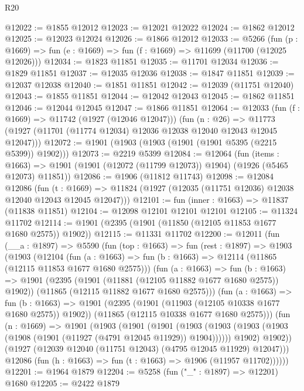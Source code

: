 \begin{lexlean}{R20}
\begin{coremodule}
@12022 := @1855 @12012
@12023 := @12021 @12022
@12024 := @1862 @12012
@12025 := @12023 @12024
@12026 := @1866 @12012
@12033 := @5266
    (fun (p : @1669) => fun (e : @1669) => fun (f : @1669) => @11699 (@11700 (@12025 @12026)))
@12034 := @1823 @11851
@12035 := @11701 @12034
@12036 := @1829 @11851
@12037 := @12035 @12036
@12038 := @1847 @11851
@12039 := @12037 @12038
@12040 := @1851 @11851
@12042 := @12039 (@11751 @12040)
@12043 := @1855 @11851
@12044 := @12042 @12043
@12045 := @1862 @11851
@12046 := @12044 @12045
@12047 := @1866 @11851
@12064 := @12033
    (fun (f : @1669) => @11742 (@1927 (@12046 @12047)))
    (fun (n : @26) =>
    @11773 (@1927 (@11701 (@11774 @12034) @12036 @12038 @12040 @12043 @12045 @12047)))
@12072 := @1901 (@1903 (@1903 (@1901 (@1901 @5395 (@2215 @5399)) @1902)))
@12073 := @2219 @5399
@12084 := @12064
    (fun (items : @1663) =>
    @1901 (@1901 (@12072 (@11799 @12073)) @1904) (@1926 (@5465 @12073) @11851))
@12086 := @1906 (@11812 @11743)
@12098 := @12084
    @12086
    (fun (t : @1669) => @11824 (@1927 (@12035 (@11751 @12036) @12038 @12040 @12043 @12045 @12047)))
@12101 := fun (inner : @1663) => @11837 (@11838 @11851)
@12104 := @12098 @12101 @12101 @12101
@12105 := @11324 @11702
@12114 := @1901 (@2395 (@1901 (@11850 (@12105 @11853 @1677 @1680 @2575)) @1902))
@12115 := @11331 @11702
@12200 := @12011
    (fun (__a : @1897) =>
    @5590
      (fun (top : @1663) =>
      fun (rest : @1897) =>
      @1903
        (@1903
          (@12104
            (fun (a : @1663) =>
            fun (b : @1663) => @12114 (@11865 (@12115 @11853 @1677 @1680 @2575)))
            (fun (a : @1663) =>
            fun (b : @1663) =>
            @1901
              (@2395 (@1901 (@11881 (@12105 @11882 @1677 @1680 @2575)) @1902))
              (@11865 (@12115 @11882 @1677 @1680 @2575)))
            (fun (a : @1663) =>
            fun (b : @1663) =>
            @1901
              (@2395 (@1901 (@11903 (@12105 @10338 @1677 @1680 @2575)) @1902))
              (@11865 (@12115 @10338 @1677 @1680 @2575)))
            (fun (n : @1669) =>
            @1901
              (@1903
                (@1901
                  (@1901
                    (@1903
                      (@1903 (@1903 (@1903 (@1908 (@1901 (@11927 (@4791 @12045 @11929)) @1904))))))
                    @1902)
                  @1902))
              (@1927 (@12039 @12040 (@11751 @12043) (@4795 @12045 @11929) @12047)))
            @12086
            (fun (h : @1663) => fun (t : @1663) => @1906 (@11957 @11702))))))
@12201 := @1964 @1879
@12204 := @5258 (fun ("_" : @1897) => @12201) @1680
@12205 := @2422 @1879

\end{coremodule}
\end{lexlean}

